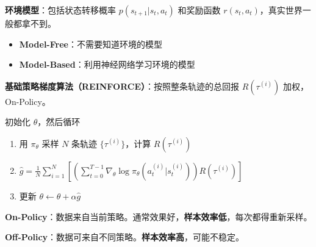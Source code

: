 \documentclass[
  8pt]{extarticle}
\providecommand{\tightlist}{%
  \setlength{\itemsep}{0pt}\setlength{\parskip}{0pt}}
\begin{document}
\begin{multicols*}{4}
\textbf{环境模型}：包括状态转移概率 \(p(s_{t+1} | s_t, a_t)\) 和奖励函数
\(r(s_t, a_t)\)，真实世界一般都拿不到。

\begin{itemize}
\tightlist
\item
  \textbf{Model-Free}：不需要知道环境的模型
\item
  \textbf{Model-Based}：利用神经网络学习环境的模型
\end{itemize}

\textbf{基础策略梯度算法（REINFORCE）}：按照整条轨迹的总回报
\(R(\tau^{(i)})\) 加权，On-Policy。

初始化 \(\theta\)，然后循环

\begin{enumerate}
\def\labelenumi{\arabic{enumi}.}
\tightlist
\item
  用 \(\pi_\theta\) 采样 \(N\) 条轨迹 \(\{\tau^{(i)}\}\)，计算
  \(R(\tau^{(i)})\)
\item
  \(\hat{g} = \frac{1}{N} \sum_{i=1}^{N} \left[ \left( \sum_{t=0}^{T-1} \nabla_\theta \log \pi_\theta(a_t^{(i)} | s_t^{(i)}) \right) R(\tau^{(i)}) \right]\)
\item
  更新 \(\theta \leftarrow \theta + \alpha \hat{g}\)
\end{enumerate}

\textbf{On-Policy}：数据来自当前策略。通常效果好，\textbf{样本效率低}，每次都得重新采样。

\textbf{Off-Policy}：数据可来自不同策略。\textbf{样本效率高}，可能不稳定。

\end{multicols*}
\end{document}
